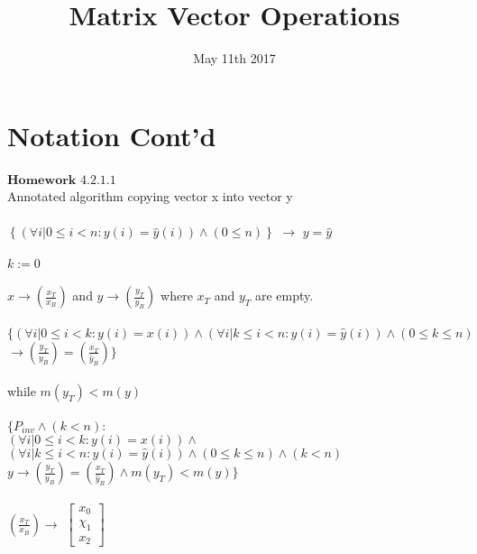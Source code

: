 \documentclass{article}
\title{Matrix Vector Operations}
\date{May 11th 2017}
\begin{document}
\maketitle

\section{Notation Cont'd}
$\mathbf{Homework}$  $\mathbf{4.2.1.1}$
\\
Annotated algorithm copying vector x into vector y
\\
\\
$\left\{(\forall i | 0 \leq i < n : y(i) = \hat{y}(i)) \land (0 \leq n)\right\}$   $\rightarrow $ $y = \hat{y}$
\\
\\
$k := 0$ 
\\
\\
$x \rightarrow (\frac{{x}_{T}}{x_{B}})$ and $y \rightarrow (\frac{{y}_{T}}{y_{B}})$ where $x_{T}$ and $y_{T}$ are empty.
\\
\\
$\lbrace (\forall i | 0 \leq i < k : y(i) = x(i)) \land
(\forall i | k \leq i < n : y(i) = \hat{y}(i)) \land (0 \leq k \leq n)$ $\rightarrow (\frac{y_{T}}{y_{B}}) = (\frac{x_{T}}{\hat{y}_{B}})\rbrace$
\\
\\
while $m(y_{T}) < m(y)$
\\
\\
$\lbrace P_{inv} \land (k < n) :$
\\
$(\forall i | 0 \leq i < k : y(i) = x(i)) \land$
\\
$(\forall i | k \leq i < n : y(i) = \hat{y}(i)) \land (0 \leq k \leq n) \land (k < n)$
\\
$y \rightarrow (\frac{{y}_{T}}{y_{B}}) = (\frac{{x}_{T}}{\hat{y}_{B}}) \land m(y_{T}) < m(y)\rbrace$
\\
\\
$(\frac{{x}_{T}}{x_{B}}) \rightarrow$ $\begin{bmatrix}
x_{0}
\\
\chi_{1}
\\
x_{2}
\end{bmatrix}$
\end{document}
